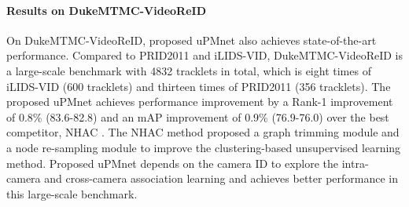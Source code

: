 \documentclass{cta-author}
\begin{document}
	\paragraph{Results on DukeMTMC-VideoReID}
	On DukeMTMC-VideoReID, proposed uPMnet also achieves state-of-the-art performance. Compared to PRID2011 and iLIDS-VID, DukeMTMC-VideoReID is a large-scale benchmark with 4832 tracklets in total, which is eight times of iLIDS-VID (600 tracklets) and thirteen times of PRID2011 (356 tracklets). The proposed uPMnet achieves performance improvement by a Rank-1 improvement of 0.8\% (83.6-82.8) and an mAP improvement of 0.9\% (76.9-76.0) over the best competitor, NHAC \cite{RN536}. The NHAC method proposed a graph trimming module and a node re-sampling module to improve the clustering-based unsupervised learning method.
	Proposed uPMnet depends on the camera ID to explore the intra-camera and cross-camera association learning and achieves better performance in this large-scale benchmark.
	
\end{document}
